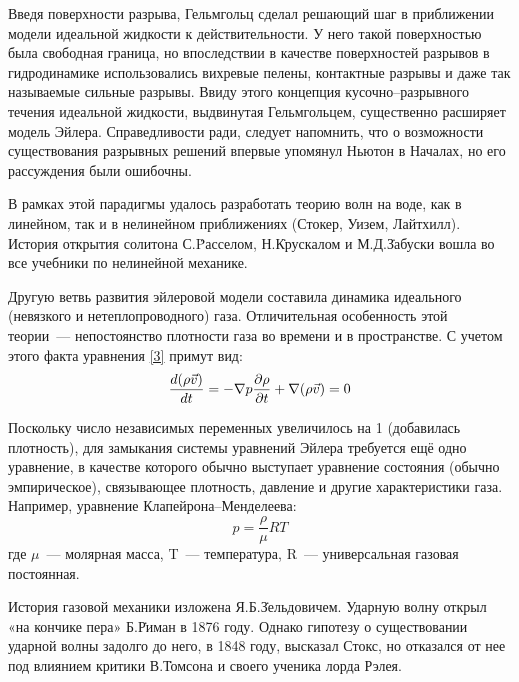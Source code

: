 Введя поверхности разрыва, Гельмгольц сделал решающий шаг в приближении модели идеальной жидкости к действительности. У него такой поверхностью была свободная граница, но впоследствии в качестве поверхностей разрывов в гидродинамике использовались вихревые пелены, контактные разрывы и даже так называемые сильные разрывы. Ввиду этого концепция кусочно--разрывного течения идеальной жидкости, выдвинутая Гельмгольцем, существенно расширяет модель Эйлера. Справедливости ради, следует напомнить, что о возможности существования разрывных решений впервые упомянул Ньютон в Началах, но его рассуждения были ошибочны.

В рамках этой парадигмы удалось разработать теорию волн на воде, как в линейном, так и в нелинейном приближениях (Стокер, Уизем, Лайтхилл). История открытия солитона С.\.Pасселом, Н.\.Крускалом и М.Д.\.Забуски вошла во все учебники по нелинейной механике.

Другую ветвь развития эйлеровой модели составила динамика идеального (невязкого и нетеплопроводного) газа. Отличительная особенность этой теории~--- непостоянство плотности газа во времени и в пространстве. С учетом этого факта уравнения \ref{3} примут вид:
$$
\frac{d (\rho \vec v)}{d t} = - \nabla p \\
\frac{\partial \rho }{\partial t} + \nabla (\rho \vec v) = 0
\label{4}
$$

Поскольку число независимых переменных увеличилось на 1 (добавилась плотность), для замыкания системы уравнений Эйлера требуется ещё одно уравнение, в качестве которого обычно выступает уравнение состояния (обычно эмпирическое), связывающее плотность, давление и другие характеристики газа. Например, уравнение Клапейрона--Менделеева:
$$
p = \frac{\rho}{\mu}RT
\label{5}
$$
где $\mu$~--- молярная масса, T~--- температура, R~--- универсальная газовая постоянная.

История газовой механики изложена Я.Б.\.Зельдовичем. Ударную волну открыл «на кончике пера» Б.\.Риман в 1876 году. Однако гипотезу о существовании ударной волны задолго до него, в 1848 году, высказал Стокс, но отказался от нее под влиянием критики В.\.Томсона и своего ученика лорда Рэлея.
